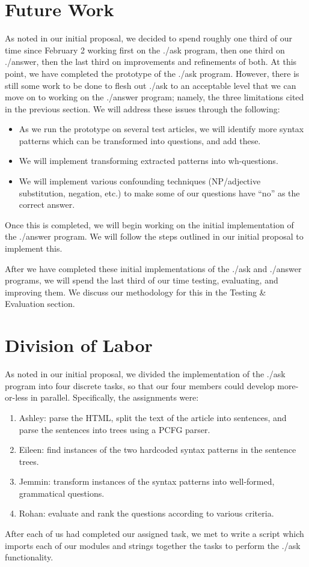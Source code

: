 \documentclass{article}
\begin{document}
\section{Future Work}
As noted in our initial proposal, we decided to spend roughly one third of our time since February 2 working first on the ./ask program, then one third on ./answer, then the last third on improvements and refinements of both. At this point, we have completed the prototype of the ./ask program. However, there is still some work to be done to flesh out ./ask to an acceptable level that we can move on to working on the ./answer program; namely, the three limitations cited in the previous section. We will address these issues through the following:
\begin{itemize}
  \item As we run the prototype on several test articles, we will identify more syntax patterns which can be transformed into questions, and add these.
  \item We will implement transforming extracted patterns into wh-questions.
  \item We will implement various confounding techniques (NP/adjective substitution, negation, etc.) to make some of our questions have ``no'' as the correct answer.
\end{itemize}
Once this is completed, we will begin working on the initial implementation of the ./answer program. We will follow the steps outlined in our initial proposal to implement this.

After we have completed these initial implementations of the ./ask and ./answer programs, we will spend the last third of our time testing, evaluating, and improving them. We discuss our methodology for this in the Testing \& Evaluation section.

\section{Division of Labor}
As noted in our initial proposal, we divided the implementation of the ./ask program into four discrete tasks, so that our four members could develop more-or-less in parallel. Specifically, the assignments were:
\begin{enumerate}
  \item Ashley: parse the HTML, split the text of the article into sentences, and parse the sentences into trees using a PCFG parser.
  \item Eileen: find instances of the two hardcoded syntax patterns in the sentence trees.
  \item Jemmin: transform instances of the syntax patterns into well-formed, grammatical questions.
  \item Rohan: evaluate and rank the questions according to various criteria.
\end{enumerate}
After each of us had completed our assigned task, we met to write a script which imports each of our modules and strings together the tasks to perform the ./ask functionality.
\end{document}

